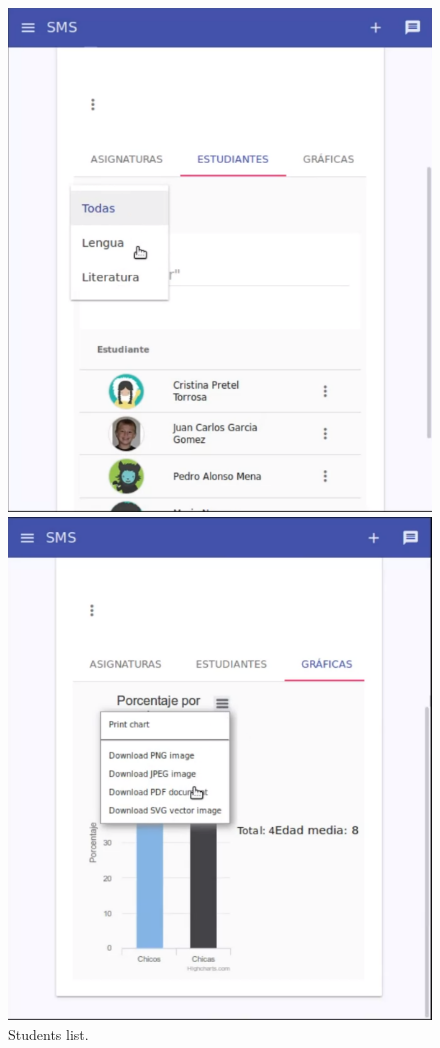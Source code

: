 \begin{figure}[H]
\centering
\begin{minipage}{.5\textwidth}
  \centering
  \includegraphics[scale=0.3]{img/snaps/teacher_profile_students.png}
  \caption{Students list.}
\end{minipage}%
\begin{minipage}{.5\textwidth}
  \centering
  \includegraphics[scale=0.3]{img/snaps/teacher_profile_graphics.png}

\end{minipage}
\end{figure}

